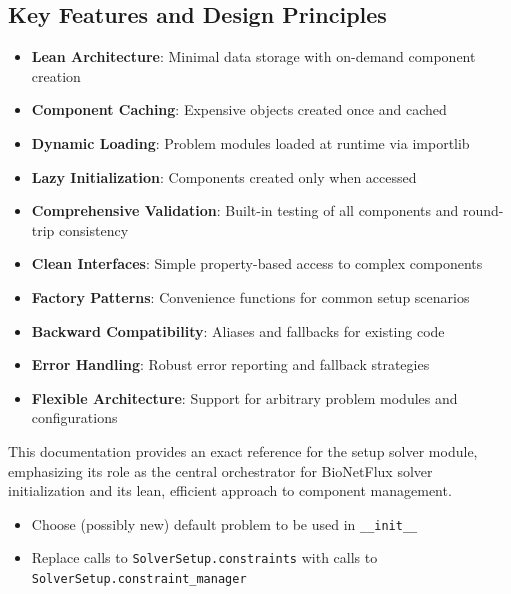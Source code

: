 \subsection{Key Features and Design Principles}

\begin{itemize}
    \item \textbf{Lean Architecture}: Minimal data storage with on-demand component creation
    \item \textbf{Component Caching}: Expensive objects created once and cached
    \item \textbf{Dynamic Loading}: Problem modules loaded at runtime via importlib
    \item \textbf{Lazy Initialization}: Components created only when accessed
    \item \textbf{Comprehensive Validation}: Built-in testing of all components and round-trip consistency
    \item \textbf{Clean Interfaces}: Simple property-based access to complex components
    \item \textbf{Factory Patterns}: Convenience functions for common setup scenarios
    \item \textbf{Backward Compatibility}: Aliases and fallbacks for existing code
    \item \textbf{Error Handling}: Robust error reporting and fallback strategies
    \item \textbf{Flexible Architecture}: Support for arbitrary problem modules and configurations
\end{itemize}

This documentation provides an exact reference for the setup solver module, emphasizing its role as the central orchestrator for BioNetFlux solver initialization and its lean, efficient approach to component management.

\begin{todobox}
	\begin{itemize}
		\item {Choose (possibly new) default problem to be used in {\tt \_\_init\_\_}}
		\item Replace calls to {\tt SolverSetup.constraints} with calls to {\tt SolverSetup.constraint\_manager}
	\end{itemize}
\end{todobox}


